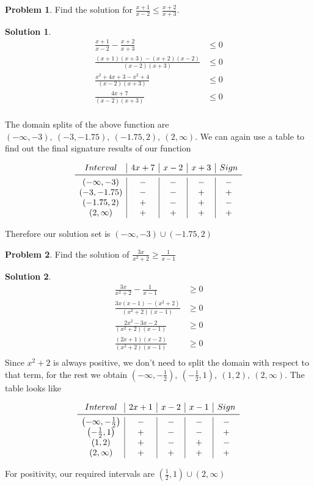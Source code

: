 \documentclass[a4paper]{article}
\theoremstyle{definition}
\newtheorem{problem}{Problem}[section]
\newtheorem*{solution}{Solution}
\begin{document}
\begin{problem}
Find the solution for \(\frac{x+1}{x-2} \leq \frac{x+2}{x+3}\).
\end{problem}
\begin{solution}
\begin{align*}
\frac{x+1}{x-2} - \frac{x+2}{x+3} &\leq 0 \\
\frac{(x+1)(x+3) - (x+2)(x-2)}{(x-2)(x+3)} &\leq 0 \\
\frac{x^2 +4x + 3 - x^2 + 4}{(x-2)(x+3)} &\leq 0 \\
\frac{4x + 7}{(x-2)(x+3)} &\leq 0 \\
\end{align*}

The domain splits of the above function are \((-\infty, -3),\ (-3, -1.75),\ (-1.75, 2),\ (2, \infty)\). We can again use a table to find out the final signature results of our function

\[
\begin{array}{c|c|c|c|c}
Interval & 4x+7 & x-2 & x+3 & Sign \\
\midrule
(-\infty, -3) & - & - & - & - \\
(-3, -1.75) & - & - & + & + \\
(-1.75, 2) & + & - & + & - \\
(2, \infty) & + & + & + & + \\
\end{array}
\]

Therefore our solution set is \((-\infty, -3) \cup (-1.75, 2)\)
\end{solution}

\begin{problem}
Find the solution of \(\frac{3x}{x^2+2} \geq \frac{1}{x-1}\)
\end{problem}
\begin{solution}
\begin{align*}
\frac{3x}{x^2+2} - \frac{1}{x-1} &\geq 0 \\
\frac{3x(x-1) - (x^2+2)}{(x^2+2)(x-1)} &\geq 0 \\
\frac{2x^2 -3x -2}{(x^2+2)(x-1)} &\geq 0 \\
\frac{(2x+1)(x-2)}{(x^2+2)(x-1)} &\geq 0 \\
\end{align*}
Since \(x^2+2\) is always positive, we don't need to split the domain with respect to that term, for the rest we obtain \(\left(-\infty, -\frac{1}{2}\right),\ \left(-\frac{1}{2}, 1\right),\ (1, 2),\ (2, \infty)\). The table looks like

\[
\begin{array}{c|c|c|c|c}
Interval & 2x+1 & x-2 & x-1 & Sign \\
\midrule
\left(-\infty, -\frac{1}{2}\right) & - & - & - & - \\
\left(-\frac{1}{2}, 1\right) & + & - & - & + \\
(1, 2) & + & - & + & - \\
(2, \infty) & + & + & + & + 
\end{array}
\]

For positivity, our required intervals are \(\left(\frac{1}{2}, 1\right) \cup (2, \infty)\)
\end{solution}
\end{document}
